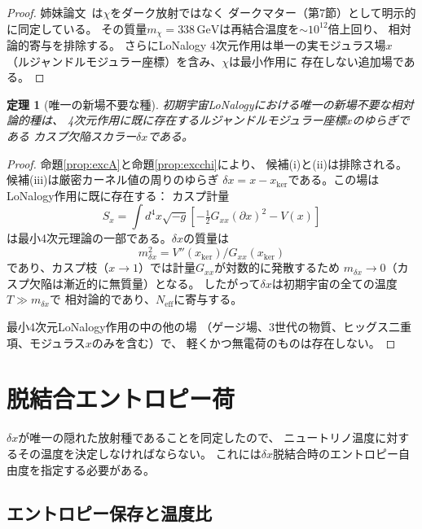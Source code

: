 \documentclass[12pt]{article}
\theoremstyle{plain}
\newtheorem{theorem}{定理}[section]
\theoremstyle{definition}
\numberwithin{equation}{section}
\newcommand{\kker}{\mathrm{ker}}
\newcommand{\eff}{\mathrm{eff}}
\begin{document}
\begin{proof}
姉妹論文~\cite{ParticleCosmo}は$\chi$をダーク放射ではなく
ダークマター（第7節）として明示的に同定している。
その質量$m_\chi=338\,\mathrm{GeV}$は再結合温度を$\sim10^{12}$倍上回り、
相対論的寄与を排除する。
さらにLoNalogy 4次元作用は単一の実モジュラス場$x$
（ルジャンドルモジュラー座標）を含み、$\chi$は最小作用に
存在しない追加場である。
\end{proof}

\begin{theorem}[唯一の新場不要な種]\label{thm:species}
初期宇宙LoNalogyにおける唯一の新場不要な相対論的種は、
4次元作用に既に存在するルジャンドルモジュラー座標$x$のゆらぎである
カスプ欠陥スカラー$\delta x$である。
\end{theorem}

\begin{proof}
命題\ref{prop:excA}と命題\ref{prop:excchi}により、
候補(i)と(ii)は排除される。候補(iii)は厳密カーネル値の周りのゆらぎ
$\delta x=x-x_{\kker}$である。この場はLoNalogy作用に既に存在する：
カスプ計量~\cite{ParticleCosmo}
\begin{equation}
S_x = \int d^4x\sqrt{-g}\left[-\tfrac{1}{2}G_{xx}(\partial x)^2 - V(x)\right]
\end{equation}
は最小4次元理論の一部である。$\delta x$の質量は
\begin{equation}
m_{\delta x}^2 = V''(x_{\kker})/G_{xx}(x_{\kker})
\end{equation}
であり、カスプ枝（$x\to1$）では計量$G_{xx}$が対数的に発散するため
$m_{\delta x}\to 0$（カスプ欠陥は漸近的に無質量）となる。
したがって$\delta x$は初期宇宙の全ての温度$T\gg m_{\delta x}$で
相対論的であり、$N_{\eff}$に寄与する。

最小4次元LoNalogy作用の中の他の場
（ゲージ場、3世代の物質、ヒッグス二重項、モジュラス$x$のみを含む）で、
軽くかつ無電荷のものは存在しない。
\end{proof}


\section{脱結合エントロピー荷}\label{sec:entropy}

$\delta x$が唯一の隠れた放射種であることを同定したので、
ニュートリノ温度に対するその温度を決定しなければならない。
これには$\delta x$脱結合時のエントロピー自由度を指定する必要がある。

\subsection{エントロピー保存と温度比}
\end{document}
